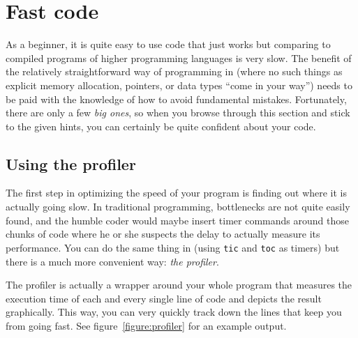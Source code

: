 \newpage
\section{Fast code}

As a \matlab{} beginner, it is quite easy to use code that just
works\texttrademark{} but comparing to compiled programs of higher programming
languages is very slow. The benefit of the relatively straightforward way of
programming in \matlab{} (where no such things as explicit memory allocation,
pointers, or data types ``come in your way'') needs to be paid with the
knowledge of how to avoid fundamental mistakes. Fortunately, there are only a
few \emph{big ones}, so when you browse through this section and stick to the
given hints, you can certainly be quite confident about your code.

\subsection{Using the profiler}

The first step in optimizing the speed of your program is finding out where it
is actually going slow. In traditional programming, bottlenecks are not quite
easily found, and the humble coder would maybe insert timer commands around
those chunks of code where he or she suspects the delay to actually measure
its performance. You can do the same thing in \matlab{} (using \lstinline!tic!
and \lstinline!toc! as timers) but there is a much more convenient way:
\emph{the profiler}.

The profiler is actually a wrapper around your whole program that measures the
execution time of each and every single line of code and depicts the result
graphically. This way, you can very quickly track down the lines that keep you
from going fast. See figure~\ref{figure:profiler} for an example output.

